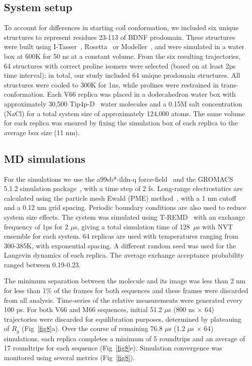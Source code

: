 \documentclass[10pt,letterpaper]{article}
\begin{document}
\subsection*{System setup} To account for differences in starting coil conformation, we included six unique structures to represent residues 23-113 of BDNF prodomain. These structures were built using I-Tasser~\cite{Yang2014,Roy2010,Bioinformatics}, Rosetta~\cite{Kim2004} or Modeller~\cite{Sali1993a}, and were simulated in a water box at 600K for 50 ns at a constant volume. From the six resulting trajectories, 64 structures with correct proline isomers were selected (based on at least 2ps time interval); in total, our study included 64 unique prodomain structures. All structures were cooled to 300K for 1ns, while prolines were restrained in trans-conformation. Each V66 replica was placed in a dodecahedron water box with approximately 30,500 Tip4p-D~\cite{Piana2015} water molecules and a 0.15M salt concentration (NaCl) for a total system size of approximately 124,000 atoms. The same volume for each replica was ensured by fixing the simulation box of each replica to the average box size (11 nm).

\subsection*{MD simulations} For the simulations we use the a99sb*-ildn-q force-field~\cite{Lindorff-Larsen2010a, Hornak2006a} and the GROMACS 5.1.2 simulation package~\cite{Berendsen1995,Abraham2015a}, with a time step of 2 fs. Long-range electrostatics are calculated using the particle mesh Ewald (PME) method~\cite{Essmann1995}, with a 1 nm cutoff and a 0.12 nm grid spacing. Periodic boundary conditions are also used to reduce system size effects. The system was simulated using T-REMD~\cite{Sugita1999a} with an exchange frequency of 1ps for 2 $\mu$s, giving a total simulation time of 128~$\mu$s with NVT ensemble for each system. 64 replicas are used with temperatures ranging from 300-385K, with exponential spacing. A different random seed was used for the Langevin dynamics of each replica. The average exchange acceptance probability ranged between 0.19-0.23. 

The minimum separation between the molecule and its image was less than 2 nm for less than 1\% of the frames for both sequences and these frames were discarded from all analysis. Time-series of the relative measurements were generated every 100 ps. For both V66 and M66 sequences, initial 51.2 $\mu$s (800 ns $\times$ 64) trajectories were discarded for equilibration purposes, determined by plateauing of $R_g$ (Fig~\ref{fig8}a). Over the course of remaining 76.8 $\mu$s (1.2 $\mu$s $\times$ 64) simulations, each replica completes a minimum of 5 roundtrips and an average of 17 roundtrips for each sequence (Fig~\ref{fig8}e). Simulation convergence was monitored using several metrics (Fig~\ref{fig8}). 
 
\end{document}
